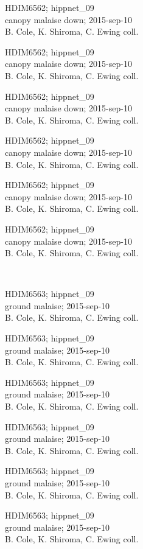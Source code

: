 \documentclass[2pt]{extarticle}
\begin{document}
\noindent
\parbox{0.16\textwidth}{\tiny \raggedright \rule[-0.3\baselineskip]{0pt}{10pt}HDIM6562; hippnet\_09\\ canopy malaise down; 2015-sep-10\\ B. Cole, K. Shiroma, C. Ewing coll.}
\parbox{0.16\textwidth}{\tiny \raggedright \rule[-0.3\baselineskip]{0pt}{10pt}HDIM6562; hippnet\_09\\ canopy malaise down; 2015-sep-10\\ B. Cole, K. Shiroma, C. Ewing coll.}
\parbox{0.16\textwidth}{\tiny \raggedright \rule[-0.3\baselineskip]{0pt}{10pt}HDIM6562; hippnet\_09\\ canopy malaise down; 2015-sep-10\\ B. Cole, K. Shiroma, C. Ewing coll.}
\parbox{0.16\textwidth}{\tiny \raggedright \rule[-0.3\baselineskip]{0pt}{10pt}HDIM6562; hippnet\_09\\ canopy malaise down; 2015-sep-10\\ B. Cole, K. Shiroma, C. Ewing coll.}
\parbox{0.16\textwidth}{\tiny \raggedright \rule[-0.3\baselineskip]{0pt}{10pt}HDIM6562; hippnet\_09\\ canopy malaise down; 2015-sep-10\\ B. Cole, K. Shiroma, C. Ewing coll.}
\parbox{0.16\textwidth}{\tiny \raggedright \rule[-0.3\baselineskip]{0pt}{10pt}HDIM6562; hippnet\_09\\ canopy malaise down; 2015-sep-10\\ B. Cole, K. Shiroma, C. Ewing coll.} \\ 
\vspace{0.001in} 

\noindent
\parbox{0.16\textwidth}{\tiny \raggedright \rule[-0.3\baselineskip]{0pt}{10pt}HDIM6563; hippnet\_09\\ ground malaise; 2015-sep-10\\ B. Cole, K. Shiroma, C. Ewing coll.}
\parbox{0.16\textwidth}{\tiny \raggedright \rule[-0.3\baselineskip]{0pt}{10pt}HDIM6563; hippnet\_09\\ ground malaise; 2015-sep-10\\ B. Cole, K. Shiroma, C. Ewing coll.}
\parbox{0.16\textwidth}{\tiny \raggedright \rule[-0.3\baselineskip]{0pt}{10pt}HDIM6563; hippnet\_09\\ ground malaise; 2015-sep-10\\ B. Cole, K. Shiroma, C. Ewing coll.}
\parbox{0.16\textwidth}{\tiny \raggedright \rule[-0.3\baselineskip]{0pt}{10pt}HDIM6563; hippnet\_09\\ ground malaise; 2015-sep-10\\ B. Cole, K. Shiroma, C. Ewing coll.}
\parbox{0.16\textwidth}{\tiny \raggedright \rule[-0.3\baselineskip]{0pt}{10pt}HDIM6563; hippnet\_09\\ ground malaise; 2015-sep-10\\ B. Cole, K. Shiroma, C. Ewing coll.}
\parbox{0.16\textwidth}{\tiny \raggedright \rule[-0.3\baselineskip]{0pt}{10pt}HDIM6563; hippnet\_09\\ ground malaise; 2015-sep-10\\ B. Cole, K. Shiroma, C. Ewing coll.} \\ 
\vspace{0.001in} 
\end{document}
